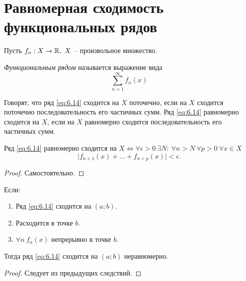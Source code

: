 \section{Равномерная сходимость функциональных рядов}

\begin{definition}
    Пусть $f_n: X \rightarrow\mathbb{R}, \ X$ -- произвольное множество.

    \emph{Функциональным рядом} называется выражение вида
    \begin{equation}\label{eq:6.14}
        \sum_{n=1}^{\infty}f_n(x)
    \end{equation}

    Говорят, что ряд \ref{eq:6.14} сходится на $X$ поточечно, если на $X$ сходится поточечно последовательность его частичных сумм. Ряд \ref{eq:6.14} равномерно сходится на $X$, если на $X$ равномерно сходится последовательность его частичных сумм.
\end{definition}

\begin{theorem}
    Ряд \ref{eq:6.14} равномерно сходится на $X \iff \forall \epsilon > 0 \ \exists N: \ \forall n > N \ \forall p > 0 \ \forall x \in X$
    \[
        \big|f_{n+1}(x) + \ldots + f_{n+p}(x)\big| < \epsilon.
    \]
\end{theorem}

\begin{proof}
    Самостоятельно.
\end{proof}

\begin{corollary}
    Если:
    \begin{enumerate}
        \item Ряд \ref{eq:6.14} сходится на $(a;b)$.
        \item Расходится в точке $b$.
        \item $\forall n \ f_n(x)$ непрерывно в точке $b$.
    \end{enumerate}

    Тогда ряд \ref{eq:6.14} сходится на $(a;b)$ неравномерно.
\end{corollary}

\begin{proof}
    Следует из предыдущих следствий.
\end{proof}